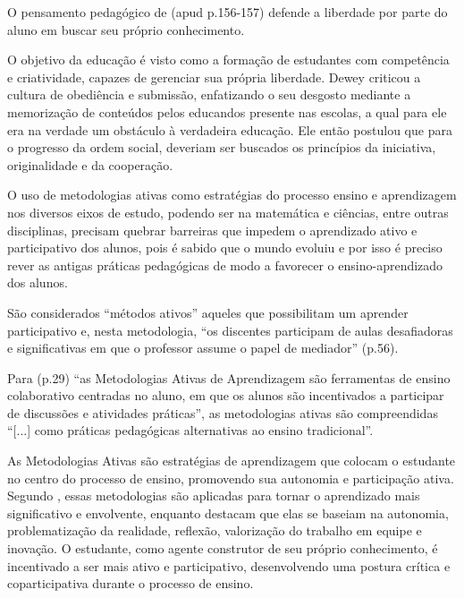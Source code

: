 O pensamento pedagógico de  (apud \cite{LOVATO2018} p.156-157) defende a liberdade por parte do aluno em buscar seu próprio conhecimento.

\begin{citacao}
    O objetivo da educação é visto como a formação de estudantes com competência e criatividade, capazes de gerenciar sua própria liberdade. Dewey criticou a cultura de obediência e submissão, enfatizando o seu desgosto mediante a memorização de conteúdos pelos educandos presente nas escolas, a qual para ele era na verdade um obstáculo à verdadeira educação. Ele então postulou que para o progresso da ordem social, deveriam ser buscados os princípios da iniciativa, originalidade e da cooperação.
\end{citacao}

O uso de metodologias ativas como estratégias do processo ensino e aprendizagem nos diversos eixos de estudo, podendo ser na matemática e ciências, entre outras disciplinas, precisam quebrar barreiras que impedem o aprendizado ativo e participativo dos alunos, pois é sabido que o mundo evoluiu e por isso é preciso rever as antigas práticas pedagógicas de modo a favorecer o ensino-aprendizado dos alunos.

São considerados ``métodos ativos'' aqueles que possibilitam um aprender participativo e, nesta metodologia, ``os discentes participam de aulas desafiadoras e significativas em que o professor assume o papel de mediador'' \cite{GOUVEIA2019} (p.56).

Para  (p.29) ``as Metodologias Ativas de Aprendizagem são ferramentas de ensino colaborativo centradas no aluno, em que os alunos são incentivados a participar de discussões e atividades práticas'', as metodologias ativas são compreendidas ``[...] como práticas pedagógicas alternativas ao ensino tradicional''.

As Metodologias Ativas são estratégias de aprendizagem que colocam o estudante no centro do processo de ensino, promovendo sua autonomia e participação ativa. Segundo , essas metodologias são aplicadas para tornar o aprendizado mais significativo e envolvente, enquanto  destacam que elas se baseiam na autonomia, problematização da realidade, reflexão, valorização do trabalho em equipe e inovação. O estudante, como agente construtor de seu próprio conhecimento, é incentivado a ser mais ativo e participativo, desenvolvendo uma postura crítica e coparticipativa durante o processo de ensino.

